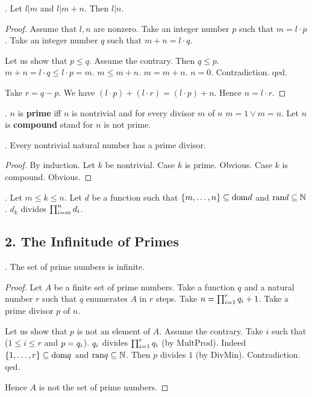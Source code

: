 \begin{lemma}.
Let $l | m$ and $l | m + n$. Then $l | n$.\end{lemma}
\begin{proof}
Assume that $l,n$ are nonzero.
Take an integer number $p$ such that $m = l \cdot p$. 
Take an integer number $q$ such that $m + n = l \cdot q$.

Let us show that $p \leq q$.
Assume the contrary. Then $q \leq p$.
$m+n = l \cdot q \leq l \cdot p = m$. $m \leq m+n$.
$m = m+n$. $n=0$.
Contradiction. qed. 

Take $r = q - p$.
We have $(l \cdot p) + (l \cdot r) = (l \cdot p) + n$.
Hence $n = l \cdot r$.
\end{proof}


\begin{definition}.
$n$ is {\bf prime} iff $n$ is nontrivial and for every divisor
$m$ of $n$ $m=1 \vee m=n$. Let $n$ is {\bf compound} stand for $n$
is not prime.
\end{definition}

\begin{theorem}.
Every nontrivial natural number has a prime divisor. \end{theorem}
\begin{proof} By induction.
Let $k$ be nontrivial.
Case $k$ is prime. Obvious.
Case $k$ is compound. Obvious.
\end{proof}

\begin{axiom}.
Let $m \leq k \leq n$. Let $d$ be a function such that $\Seq{m}{n} \subseteq \text{dom} d$ and $\text{ran} d \subseteq \NN$.
$d_k$ divides $\Product{d}{m}{n}$.
\end{axiom}

\subsection{2. The Infinitude of Primes}

\begin{theorem}.
The set of prime numbers is infinite.\end{theorem}
\begin{proof}
Let $A$ be a finite set of prime numbers.
Take a function $q$ and a natural number $r$ such that $q$ enumerates
$A$ in $r$ steps.
Take $n=\Product{q}{1}{r}+1$.
Take a prime divisor $p$ of $n$.

Let us show that $p$ is not an element of $A$.
Assume the contrary.
Take $i$ such that ($1 \leq i \leq r$ and $p=\subs{q}{i}$).
$\subs{q}{i}$ divides $\Product{q}{1}{r}$ (by MultProd).
Indeed $\Seq{1}{r} \subseteq \text{dom} q$ and 
$\text{ran} q \subseteq \NN$.
Then $p$ divides $1$ (by DivMin). 
Contradiction. qed.

Hence $A$ is not the set of prime numbers.
\end{proof}


